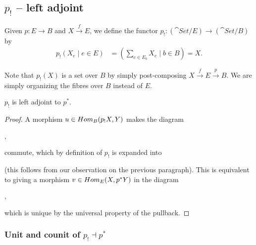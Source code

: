 \subsection{$p_!$ -- left adjoint}
Given $p: E\to B$ and $X\overset{f}{\to} E$, we define the functor $p_! : (\cat{Set}/ E)\to(\cat{Set}/ B)$ by
\begin{align*}
	p_!\left( X_e \mid e\in E \right) &= \left( \sum_{e\in E_b} X_e \mid b\in B \right) = X.
\end{align*}

Note that $p_!(X)$ is a set over $B$ by simply post-composing $X\overset{f}{\to} E\overset{p}{\to} B$. We are simply organizing the fibres over $B$ instead of $E$.

\begin{proposition}
	$p_!$ is left adjoint to $p^*$.
\end{proposition}
\begin{proof}
	A morphism $u\in Hom_B(p_!X,Y)$ makes the diagram
	\begin{center}
	,
	\end{center}
	commute, which by definition of $p_!$ is expanded into
	\begin{center}
	\end{center}
	(this follows from our observation on the previous paragraph). This is equivalent to giving a morphism $v\in Hom_E(X,p^*Y)$ in the diagram
	\begin{center}
	,
	\end{center}
	which is unique by the universal property of the pullback.
\end{proof}


\subsubsection{Unit and counit of $p_! \dashv p^*$}

